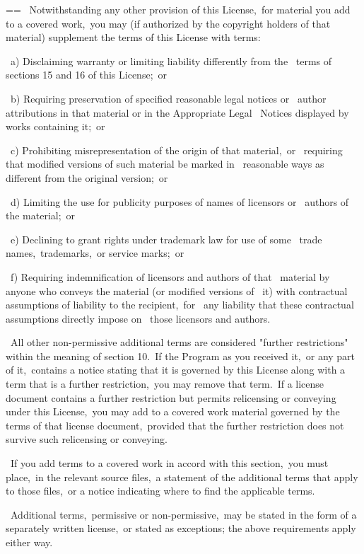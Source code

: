 \documentclass{book}
\makeatletter
\newenvironment{Texinfopreformatted}{%
  \par\GNUTobeylines\obeyspaces\frenchspacing\parskip=\z@\parindent=\z@}{}
{\catcode`\^^M=13 \gdef\GNUTobeylines{\catcode`\^^M=13 \def^^M{\null\par}}}
\newenvironment{Texinfoindented}{\begin{list}{}{}\item\relax}{\end{list}}
\renewcommand{\_}{\Texinfounderscore\discretionary{}{}{}}
\makeatother
\begin{document}
\begin{Texinfoindented}
\begin{Texinfopreformatted}
\  Notwithstanding any other provision of this License,\ for material you
add to a covered work,\ you may (if authorized by the copyright holders of
that material) supplement the terms of this License with terms:

\    a) Disclaiming warranty or limiting liability differently from the
\    terms of sections 15 and 16 of this License;\ or

\    b) Requiring preservation of specified reasonable legal notices or
\    author attributions in that material or in the Appropriate Legal
\    Notices displayed by works containing it;\ or

\    c) Prohibiting misrepresentation of the origin of that material,\ or
\    requiring that modified versions of such material be marked in
\    reasonable ways as different from the original version;\ or

\    d) Limiting the use for publicity purposes of names of licensors or
\    authors of the material;\ or

\    e) Declining to grant rights under trademark law for use of some
\    trade names,\ trademarks,\ or service marks;\ or

\    f) Requiring indemnification of licensors and authors of that
\    material by anyone who conveys the material (or modified versions of
\    it) with contractual assumptions of liability to the recipient,\ for
\    any liability that these contractual assumptions directly impose on
\    those licensors and authors.

\  All other non-permissive additional terms are considered "further
restrictions" within the meaning of section 10.\  If the Program as you
received it,\ or any part of it,\ contains a notice stating that it is
governed by this License along with a term that is a further
restriction,\ you may remove that term.\  If a license document contains
a further restriction but permits relicensing or conveying under this
License,\ you may add to a covered work material governed by the terms
of that license document,\ provided that the further restriction does
not survive such relicensing or conveying.

\  If you add terms to a covered work in accord with this section,\ you
must place,\ in the relevant source files,\ a statement of the
additional terms that apply to those files,\ or a notice indicating
where to find the applicable terms.

\  Additional terms,\ permissive or non-permissive,\ may be stated in the
form of a separately written license,\ or stated as exceptions;
the above requirements apply either way.


\end{Texinfopreformatted}
\end{Texinfoindented}
\end{document}
